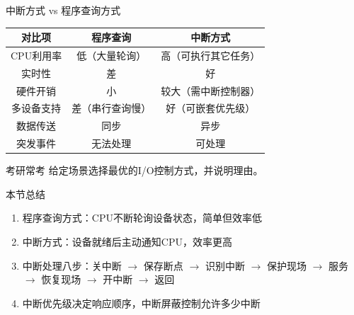 \documentclass[10pt, aspectratio=169]{beamer}
\begin{document}
\begin{frame}{中断方式 vs 程序查询方式}
    \begin{center}
        \begin{tabular}{|c|c|c|}
            \hline
            \textbf{对比项} & \textbf{程序查询} & \textbf{中断方式} \\
            \hline
            CPU利用率 & 低（大量轮询） & 高（可执行其它任务） \\
            实时性 & 差 & 好 \\
            硬件开销 & 小 & 较大（需中断控制器） \\
            多设备支持 & 差（串行查询慢） & 好（可嵌套优先级） \\
            数据传送 & 同步 & 异步 \\
            突发事件 & 无法处理 & 可处理 \\
            \hline
        \end{tabular}
    \end{center}
    \vspace{0.5em}
    \begin{block}{考研常考}
        给定场景选择最优的I/O控制方式，并说明理由。
    \end{block}
\end{frame}

\begin{frame}{本节总结}
    \begin{enumerate}
        \item 程序查询方式：CPU不断轮询设备状态，简单但效率低
        \item 中断方式：设备就绪后主动通知CPU，效率更高
        \item 中断处理八步：关中断 $\rightarrow$ 保存断点 $\rightarrow$ 识别中断 $\rightarrow$ 保护现场 $\rightarrow$ 服务 $\rightarrow$ 恢复现场 $\rightarrow$ 开中断 $\rightarrow$ 返回
        \item 中断优先级决定响应顺序，中断屏蔽控制允许多少中断
    \end{enumerate}
\end{frame}
\end{document}
